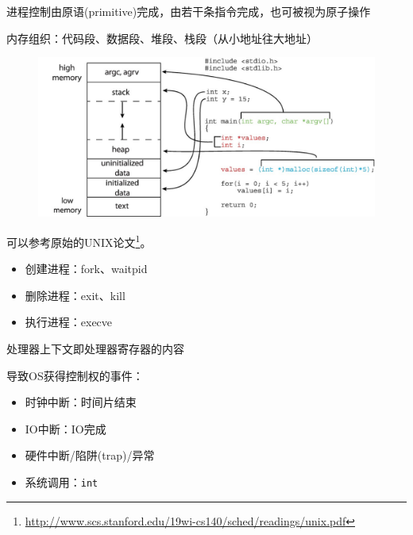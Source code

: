 进程控制由原语(primitive)完成，由若干条指令完成，也可被视为原子操作

内存组织：代码段、数据段、堆段、栈段（从小地址往大地址）
\begin{figure}[H]
\centering
\includegraphics[width=0.8\linewidth]{fig/C_memory.jpg}
\end{figure}

可以参考原始的UNIX论文\footnote{\url{http://www.scs.stanford.edu/19wi-cs140/sched/readings/unix.pdf}}。
\begin{itemize}
	\item 创建进程：fork、waitpid
	\item 删除进程：exit、kill
	\item 执行进程：execve
\end{itemize}



处理器上下文即处理器寄存器的内容
\begin{center}
\end{center}


导致OS获得控制权的事件：
\begin{itemize}
	\item 时钟中断：时间片结束
	\item IO中断：IO完成
	\item 硬件中断/陷阱(trap)/异常
	\item 系统调用：\verb'int'
\end{itemize}